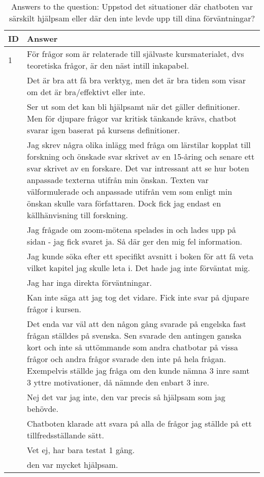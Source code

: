\begin{table}[h]
\centering
{\small
\begin{tabularx}{\textwidth}{@{}lX@{}}
\toprule
\textbf{ID} & \textbf{Answer} \\ \midrule
1 & För frågor som är relaterade till självaste kursmaterialet, dvs teoretiska frågor, är den näst intill inkapabel. \\ \hdashline
2 & Det är bra att få bra verktyg, men det är bra tiden som visar om det är bra/effektivt eller inte. \\ \hdashline
3 & Ser ut som det kan bli hjälpsamt när det gäller definitioner. Men för djupare frågor var kritisk tänkande krävs, chatbot svarar igen baserat på kursens definitioner. \\ \hdashline
4 & Jag skrev några olika inlägg med fråga om lärstilar kopplat till forskning och önskade svar skrivet av en 15-åring och senare ett svar skrivet av en forskare. Det var intressant att se hur boten anpassade texterna utifrån min önskan. Texten var välformulerade och anpassade utifrån vem som enligt min önskan skulle vara författaren. Dock fick jag endast en källhänvisning till forskning. \\ \hdashline
5 & Jag frågade om zoom-mötena spelades in och lades upp på sidan - jag fick svaret ja. Så där ger den mig fel information. \\ \hdashline
6 & Jag kunde söka efter ett specifikt avsnitt i boken för att få veta vilket kapitel jag skulle leta i. Det hade jag inte förväntat mig. \\ \hdashline
7 & Jag har inga direkta förväntningar. \\ \hdashline
8 & Kan inte säga att jag tog det vidare. Fick inte svar på djupare frågor i kursen. \\ \hdashline
9 & Det enda var väl att den någon gång svarade på engelska fast frågan ställdes på svenska. Sen svarade den antingen ganska kort och inte så uttömmande som andra chatbotar på vissa frågor och andra frågor svarade den inte på hela frågan. Exempelvis ställde jag fråga om den kunde nämna 3 inre samt 3 yttre motivationer, då nämnde den enbart 3 inre. \\ \hdashline
10 & Nej det var jag inte, den var precis så hjälpsam som jag behövde. \\ \hdashline
11 & Chatboten klarade att svara på alla de frågor jag ställde på ett tillfredsställande sätt. \\ \hdashline
12 & Vet ej, har bara testat 1 gång. \\ \hdashline
13 & den var mycket hjälpsam. \\
\bottomrule
\end{tabularx}
}
\vspace{2mm}
\caption{Answers to the question: Uppstod det situationer där chatboten var särskilt hjälpsam eller där den inte levde upp till dina förväntningar?}
\label{tab:appendix_typeform_table_question_helpful_or_fell_short}
\end{table}

